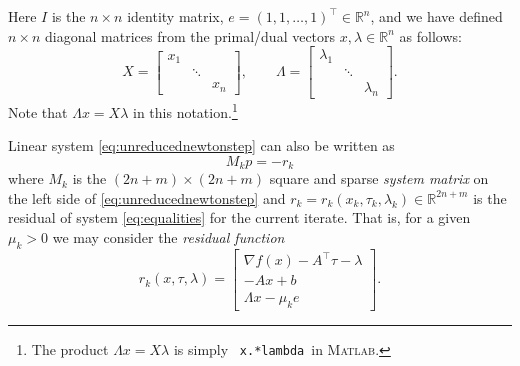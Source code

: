 \documentclass[11pt]{article}
\newcommand{\RR}{\mathbb{R}}
\newcommand{\grad}{\nabla}
\newcommand{\Matlab}{\textsc{Matlab}\xspace}
\begin{document}
Here $I$ is the $n\times n$ identity matrix, $e=(1,1,\dots,1)^\top \in \RR^n$, and we have defined $n\times n$ diagonal matrices from the primal/dual vectors $x,\lambda\in\RR^n$ as follows:
    $$X = \begin{bmatrix} x_1 & & \\ & \ddots & \\ & & x_n \end{bmatrix}, \qquad \Lambda = \begin{bmatrix} \lambda_1 & & \\ & \ddots & \\ & & \lambda_n \end{bmatrix}.$$
Note that $\Lambda x = X \lambda$ in this notation.\footnote{The product $\Lambda x = X\lambda$ is simply \, \texttt{x.*lambda}\, in \Matlab.}

Linear system \eqref{eq:unreducednewtonstep} can also be written as
\begin{equation}
M_k p = - r_k \label{eq:overallnewtonstep}
\end{equation}
where $M_k$ is the $(2n+m) \times (2n+m)$ square and sparse \emph{system matrix} on the left side of \eqref{eq:unreducednewtonstep} and $r_k=r_k(x_k,\tau_k,\lambda_k) \in \RR^{2n+m}$ is the residual of system \eqref{eq:equalities} for the current iterate.  That is, for a given $\mu_k>0$ we may consider the \emph{residual function}
\begin{equation}
r_k(x,\tau,\lambda) = \begin{bmatrix}
\grad f(x) - A^\top \tau - \lambda \\
- A x + b \\
\Lambda x - \mu_k e
\end{bmatrix}. \label{eq:residualnewtonstep}
\end{equation}
\end{document}
